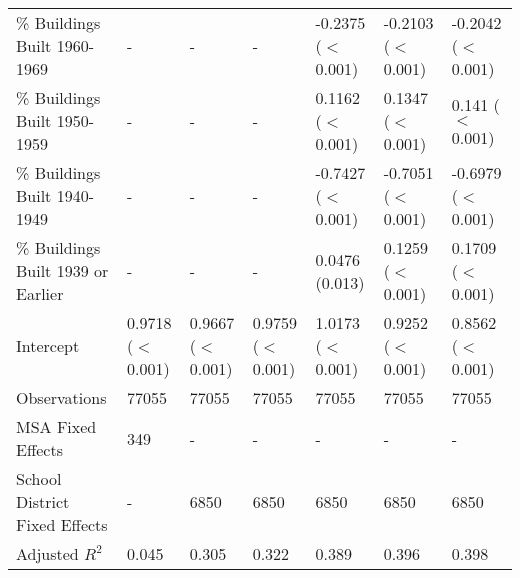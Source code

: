 \begin{table}[h]
\begin{tabular}{l|llllll}
\% Buildings Built 1960-1969 &- & - & - & -0.2375 ($<$0.001) & -0.2103 ($<$0.001) & -0.2042 ($<$0.001) \\
\% Buildings Built 1950-1959 &- & - & - & 0.1162 ($<$0.001) & 0.1347 ($<$0.001) & 0.141 ($<$0.001) \\
\% Buildings Built 1940-1949 &- & - & - & -0.7427 ($<$0.001) & -0.7051 ($<$0.001) & -0.6979 ($<$0.001) \\
\% Buildings Built 1939 or Earlier &- & - & - & 0.0476 (0.013) & 0.1259 ($<$0.001) & 0.1709 ($<$0.001) \\
Intercept &0.9718 ($<$0.001) & 0.9667 ($<$0.001) & 0.9759 ($<$0.001) & 1.0173 ($<$0.001) & 0.9252 ($<$0.001) & 0.8562 ($<$0.001) \\
Observations &77055 & 77055 & 77055 & 77055 & 77055 & 77055 \\
MSA Fixed Effects &349 & - & - & - & - & - \\
School District Fixed Effects &- & 6850 & 6850 & 6850 & 6850 & 6850 \\
Adjusted $R^2$ &0.045 & 0.305 & 0.322 & 0.389 & 0.396 & 0.398 \\\hline
\end{tabular}
\end{table}
